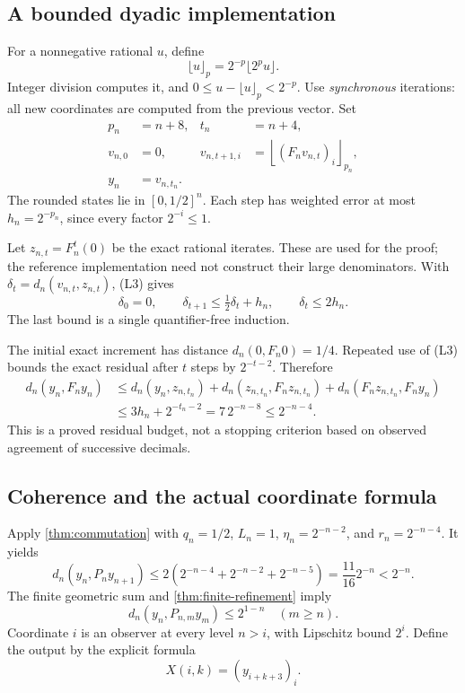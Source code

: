 \subsection{A bounded dyadic implementation}

For a nonnegative rational \(u\), define
\[
 \lfloor u\rfloor_p=2^{-p}\lfloor2^pu\rfloor.
\]
Integer division computes it, and
\(0\le u-\lfloor u\rfloor_p<2^{-p}\). Use
\emph{synchronous} iterations: all new coordinates are computed from
the previous vector. Set
\begin{align*}
 p_n&=n+8, & t_n&=n+4,\\
 v_{n,0}&=0, &
 v_{n,t+1,i}&=\left\lfloor(F_nv_{n,t})_i\right\rfloor_{p_n},\\
 y_n&=v_{n,t_n}.&&
\end{align*}
The rounded states lie in \([0,1/2]^n\). Each step has weighted
error at most \(h_n=2^{-p_n}\), since every factor \(2^{-i}\le1\).

Let \(z_{n,t}=F_n^t(0)\) be the exact rational iterates. These are
used for the proof; the reference implementation need not construct
their large denominators. With
\(\delta_t=d_n(v_{n,t},z_{n,t})\), (L3) gives
\[
 \delta_0=0,\qquad
 \delta_{t+1}\le\tfrac12\delta_t+h_n,
 \qquad \delta_t\le2h_n.                       \tag{L5}
\]
The last bound is a single quantifier-free induction.

The initial exact increment has distance
\(d_n(0,F_n0)=1/4\). Repeated use of (L3) bounds the exact residual
after \(t\) steps by \(2^{-t-2}\). Therefore
\begin{align*}
 d_n(y_n,F_ny_n)
 &\le d_n(y_n,z_{n,t_n})
       +d_n(z_{n,t_n},F_nz_{n,t_n})
       +d_n(F_nz_{n,t_n},F_ny_n)\\
 &\le3h_n+2^{-t_n-2}
   =7\,2^{-n-8}
   \le2^{-n-4}.
\end{align*}
This is a proved residual budget, not a stopping criterion based on
observed agreement of successive decimals.

\subsection{Coherence and the actual coordinate formula}

Apply \cref{thm:commutation} with \(q_n=1/2\), \(L_n=1\),
\(\eta_n=2^{-n-2}\), and \(r_n=2^{-n-4}\). It yields
\[
 d_n(y_n,P_ny_{n+1})
 \le2(2^{-n-4}+2^{-n-2}+2^{-n-5})
 =\frac{11}{16}2^{-n}<2^{-n}.                  \tag{L6}
\]
The finite geometric sum and \cref{thm:finite-refinement} imply
\[
 d_n(y_n,P_{n,m}y_m)\le2^{1-n}\quad(m\ge n).
 \tag{L7}
\]
Coordinate \(i\) is an observer at every level \(n>i\), with
Lipschitz bound \(2^i\). Define the output by the explicit formula
\[
 \boxed{X(i,k)=(y_{i+k+3})_i.}                 \label{eq:lattice-name}\tag{L8}
\]

